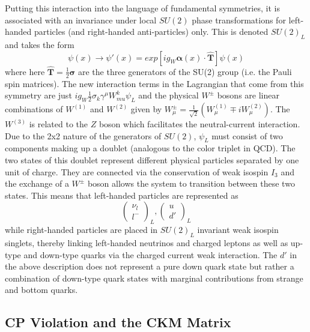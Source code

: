 Putting this interaction into the language of fundamental symmetries, it is associated with an invariance under 
local $SU(2)$ phase transformations for left-handed particles (and right-handed anti-particles) only. This is 
denoted $SU(2)_L$ and takes the form 
\begin{equation}
\psi(x) \rightarrow \psi'(x) = exp[ig_{W} \boldsymbol{\alpha}(x) \cdot \boldsymbol{\hat{T}}] \psi(x)
\end{equation}
where here $\boldsymbol{\hat{T}} = \frac{1}{2}\boldsymbol{\sigma}$ are the three generators of the SU(2) 
group (i.e. the Pauli spin matrices). The new interaction terms in the Lagrangian that come from this symmetry are 
just $ig_W\frac{1}{2}\sigma_k\gamma^{\mu}W_{mu}^k\psi_L$ and the physical $W^{\pm}$ bosons are linear 
combinations of $W^{(1)}$ and $W^{(2)}$ given by 
$W^{\pm}_{\mu} = \frac{1}{\sqrt{2}}(W^{(1)}_{\mu} \mp iW^{(2)}_{\mu})$. The $W^{(3)}$ is related to the $Z$ 
boson which facilitates the neutral-current interaction. Due to the 2x2 nature of the generators of $SU(2)$, 
$\psi_L$ must consist of two components making up a doublet (analogous to the color triplet in QCD). The two 
states of this doublet represent different physical particles separated by one unit of charge. They are connected 
via the conservation of weak isospin $I_3$ and the exchange of a $W^{\pm}$ boson allows the system to 
transition between these two states. This means that left-handed particles are represented as
\begin{equation}
\begin{pmatrix} \nu_{l} \\ l^- \end{pmatrix}_L, 
\begin{pmatrix} u \\ d' \end{pmatrix}_L
\end{equation}
while right-handed particles are placed in $SU(2)_L$ invariant weak isospin singlets, thereby linking left-handed 
neutrinos and charged leptons as well as up-type and down-type quarks via the charged current weak interaction.  
The $d'$ in the above description does not represent a pure down quark state but rather a combination of down-type 
quark states with marginal contributions from strange and bottom quarks.

\subsection{CP Violation and the CKM Matrix}

